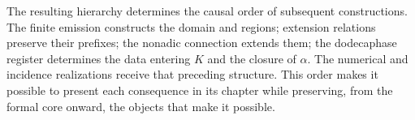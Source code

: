 The resulting hierarchy determines the causal order of subsequent
constructions.
The finite emission constructs the domain and regions; extension relations
preserve their prefixes; the nonadic connection extends them; the
dodecaphase register determines the data entering \(K\) and the
closure of \(\alpha\). The numerical and incidence realizations
receive that preceding structure. This order makes it possible to present
each consequence in its chapter while preserving, from the formal core onward,
the objects that make it possible.
